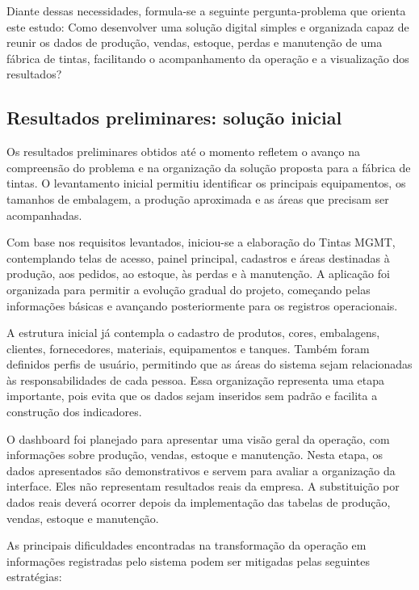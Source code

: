 \documentclass[12pt,a4paper]{article}
\begin{document}
Diante dessas necessidades, formula-se a seguinte pergunta-problema que orienta este estudo: Como desenvolver uma solução digital simples e organizada capaz de reunir os dados de produção, vendas, estoque, perdas e manutenção de uma fábrica de tintas, facilitando o acompanhamento da operação e a visualização dos resultados?

\subsection{Resultados preliminares: solução inicial}
Os resultados preliminares obtidos até o momento refletem o avanço na compreensão do problema e na organização da solução proposta para a fábrica de tintas. O levantamento inicial permitiu identificar os principais equipamentos, os tamanhos de embalagem, a produção aproximada e as áreas que precisam ser acompanhadas.

Com base nos requisitos levantados, iniciou-se a elaboração do Tintas MGMT, contemplando telas de acesso, painel principal, cadastros e áreas destinadas à produção, aos pedidos, ao estoque, às perdas e à manutenção. A aplicação foi organizada para permitir a evolução gradual do projeto, começando pelas informações básicas e avançando posteriormente para os registros operacionais.

A estrutura inicial já contempla o cadastro de produtos, cores, embalagens, clientes, fornecedores, materiais, equipamentos e tanques. Também foram definidos perfis de usuário, permitindo que as áreas do sistema sejam relacionadas às responsabilidades de cada pessoa. Essa organização representa uma etapa importante, pois evita que os dados sejam inseridos sem padrão e facilita a construção dos indicadores.

O dashboard foi planejado para apresentar uma visão geral da operação, com informações sobre produção, vendas, estoque e manutenção. Nesta etapa, os dados apresentados são demonstrativos e servem para avaliar a organização da interface. Eles não representam resultados reais da empresa. A substituição por dados reais deverá ocorrer depois da implementação das tabelas de produção, vendas, estoque e manutenção.

As principais dificuldades encontradas na transformação da operação em informações registradas pelo sistema podem ser mitigadas pelas seguintes estratégias:
\end{document}
